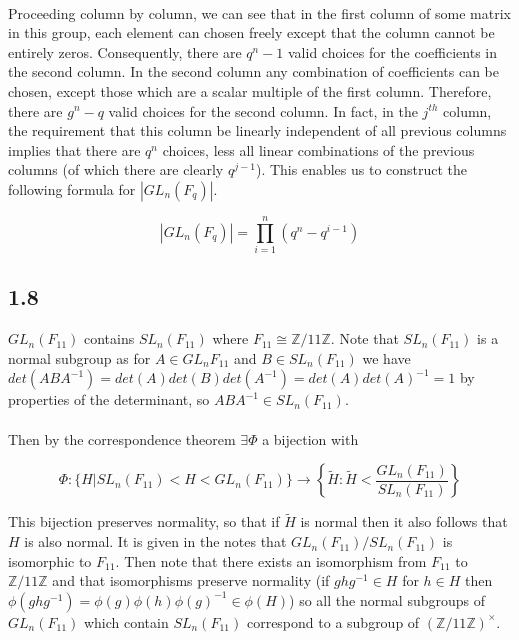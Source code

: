 \documentclass{article}
\begin{document}
\paragraph{}
Proceeding column by column, we 
can see that in the first column of some matrix in this group, each element can chosen freely except that the column cannot 
be entirely zeros. Consequently, there are $q^n -1$ valid choices for the coefficients in the 
second column. In the second column any combination of coefficients can be chosen, except those 
which are a scalar multiple of the first column. Therefore, there are $g^n -q$ valid choices for 
the second column. In fact, in the $j^{th}$ column, the requirement that this column be linearly 
independent of all previous columns implies that there are $q^n$ choices, less all linear combinations 
of the previous columns (of which there are clearly $q^{j-1}$). This enables us to construct the 
following formula for $|GL_n(F_q)|$.

\begin{equation*}
	|GL_n(F_q)| = \prod_{i=1}^n(q^n-q^{i-1})
\end{equation*}

\subsection*{1.8}
$GL_n(F_{11})$ contains $SL_n(F_{11})$ where $F_{11} \cong \mathbb{Z}/11\mathbb{Z}$. Note that 
$SL_n(F_{11})$ is a normal subgroup as for $A \in GL_n{F_{11}}$ and $B \in SL_n(F_{11})$ we have 
$det(ABA^{-1}) = det(A)det(B)det(A^{-1}) = det(A)det(A)^{-1} = 1$ by properties of the determinant, 
so $ABA^{-1} \in SL_n(F_{11})$.

\paragraph{}
Then by the correspondence theorem $\exists \varPhi$ a bijection with 

\begin{equation*}
	\varPhi:\{H|SL_n(F_{11}) < H < GL_n(F_{11})\} \rightarrow \left\{\tilde H: \tilde H < \frac{GL_n(F_{11})}{SL_n(F_{11})}\right\}
\end{equation*}

This bijection preserves normality, so that if $\tilde H$ is normal then it also follows that 
$H$ is also normal. It is given in the notes that $GL_n(F_{11})/SL_n(F_{11})$ is isomorphic to $F_{11}$. Then note that there exists an isomorphism from $F_{11}$ to $\mathbb{Z}/11\mathbb{Z}$ 
and that isomorphisms preserve normality (if $ghg^{-1} \in H$ for $h \in H$ then $\phi(ghg^{-1}) = \phi(g)\phi(h)\phi(g)^{-1} \in \phi(H)$)
so all the normal subgroups of $GL_n(F_{11})$ which contain $SL_n(F_{11})$ correspond to a subgroup of 
$(\mathbb{Z}/11\mathbb{Z})^\times$.
\end{document}

